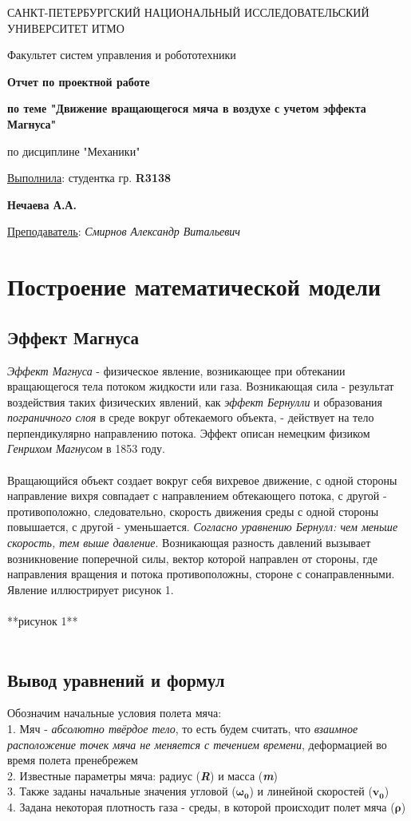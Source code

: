 \documentclass[a5paper, 10pt]{article}
\theoremstyle{definition}
\theoremstyle{plain}
\theoremstyle{remark}
\newcommand*{\titlePage}{
	\thispagestyle{title}
	\begingroup
	\begin{center}
		\vspace*{6ex}
		
		{\small
			САНКТ-ПЕТЕРБУРГСКИЙ НАЦИОНАЛЬНЫЙ ИССЛЕДОВАТЕЛЬСКИЙ УНИВЕРСИТЕТ ИТМО	
		}
		
		\vspace*{2ex}
		
		{\normalsize
			Факультет систем управления и робототехники
		}
		
		\vspace*{15ex}
		
		{\Large \bfseries 
			Отчет по проектной работе
		}
\vspace*{2ex}
		
		{\Large \bfseries 
			по теме "Движение вращающегося мяча в воздухе с учетом эффекта Магнуса"
		}
\vspace*{2ex}
		
		{\Large
			по дисциплине "Механики"
		}

	\end{center}
	\vspace*{20ex}
	\begin{flushright}
		{\large 
			\underline{Выполнила}: студентка гр. \textbf{R3138}\\
			\begin{flushright}
				\textbf{Нечаева А.А.}\\
			\end{flushright}
		}
		
		\vspace*{5ex}
		
		{\large 
			\underline{Преподаватель}: \textit{Смирнов Александр Витальевич}
		}
	\end{flushright}	
	\newpage
	\setcounter{page}{2}
	\endgroup}
\begin{document}
	\titlePage
	\pagestyle{style}
\newpage
\section{Построение математической модели}
\subsection{Эффект Магнуса}
\textit{Эффект Магнуса} - физическое явление, возникающее при обтекании вращающегося тела потоком жидкости или газа. Возникающая сила - результат воздействия таких физических явлений, как \textit{эффект Бернулли} и образования \textit{пограничного слоя} в среде вокруг обтекаемого объекта, - действует на тело перпендикулярно направлению потока. Эффект описан немецким физиком \textit{Генрихом Магнусом} в 1853 году. \\\\
Вращающийся объект создает вокруг себя вихревое движение, с одной стороны направление вихря совпадает с направлением обтекающего потока, с другой - противоположно, следовательно, скорость движения среды с одной стороны повышается, с другой - уменьшается. \textit{Согласно уравнению Бернулл: чем меньше скорость, тем выше давление}. Возникающая разность давлений вызывает возникновение поперечной силы, вектор которой направлен от стороны, где направления вращения и потока противоположны, стороне с сонаправленными. Явление иллюстрирует рисунок 1.
\\\\
**рисунок 1**
\\\\
\subsection{Вывод уравнений и формул}	
Обозначим начальные условия полета мяча:\\
1. Мяч - \textit{абсолютно твёрдое тело}, то есть будем считать, что \textit{взаимное расположение точек мяча не меняется с течением времени}, деформацией во время полета пренебрежем\\
2. Известные параметры мяча: радиус (\textit{\textbf{R}}) и масса (\textit{\textbf{m}})\\
3. Также заданы начальные значения угловой ($\mathbf{\omega_{0}}$) и линейной скоростей ($\mathbf{v_{0}}$)\\
4. Задана некоторая плотность газа - среды, в которой происходит полет мяча ($\mathbf{\rho}$)\\\\
\end{document}
